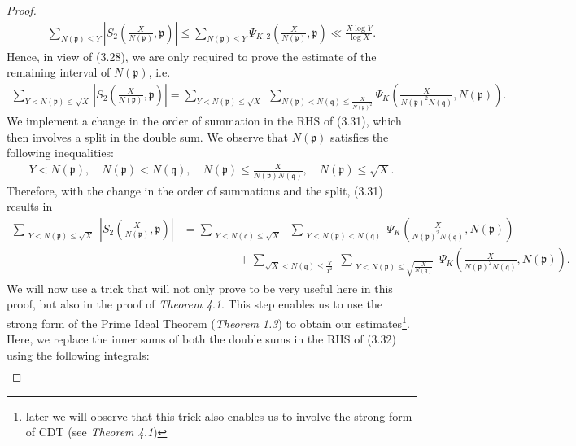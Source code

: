 \documentclass[12pt]{article}
\numberwithin{equation}{section}
\numberwithin{equation}{section}
\begin{document}
\begin{proof}
\begin{align}
    \sum_{N(\mathfrak{p})\leq Y} \left|S_2\left(\frac{X}{N(\mathfrak{p})},\mathfrak{p}\right)\right|\leq   \sum_{N(\mathfrak{p})\leq Y} \Psi_{K,2}\left(\frac{X}{N(\mathfrak{p})},\mathfrak{p}\right) \ll \frac{X\log Y}{\log X}.
\end{align}
Hence, in view of (3.28), we are only required to prove the estimate of the remaining interval of $N(\mathfrak{p})$, i.e.
\begin{align}
    \sum_{Y<N(\mathfrak{p}) \leq\sqrt{X}} \left|S_2\left(\frac{X}{N(\mathfrak{p})},\mathfrak{p}\right)\right| = \sum_{Y < N(\mathfrak{p})\leq \sqrt{X}} \;\sum_{N(\mathfrak{p})<N(\mathfrak{q})\leq \frac{X}{N(\mathfrak{p})^2}} \Psi_K\left(\frac{X}{N(\mathfrak{p})^2N(\mathfrak{q})},N(\mathfrak{p})\right).
\end{align}
We implement a change in the order of summation in the RHS of (3.31), which then involves a split in the double sum. We observe that $N(\mathfrak{p})$ satisfies the following inequalities:
\begin{align}
    Y<N(\mathfrak{p}), \quad N(\mathfrak{p})<N(\mathfrak{q}), \quad N(\mathfrak{p})\leq \frac{X}{N(\mathfrak{p})N(\mathfrak{q})},\quad N(\mathfrak{p}) \leq \sqrt{X} .\nonumber
\end{align}
Therefore, with the change in the order of summations and the split, (3.31) results in
\begin{align}
    \sum_{\substack{Y<N(\mathfrak{p}) \leq \sqrt{X} }} \left|S_2\left(\frac{X}{N(\mathfrak{p})},\mathfrak{p}\right)\right| &= \sum_{\substack{Y <N(\mathfrak{q}) \leq \sqrt{X}}} \;  \sum_{\substack{Y<N(\mathfrak{p})<N(\mathfrak{q}) }} \Psi_K\left(\frac{X}{N(\mathfrak{p})^2N(\mathfrak{q})},N(\mathfrak{p})\right) \nonumber \\ &\hspace{2cm}+ \sum_{\sqrt{X} < N(\mathfrak{q}) \leq \frac{X}{Y^2}} \;\sum_{\substack{Y<N(\mathfrak{p})\leq \sqrt{\frac{X}{N(\mathfrak{q})} } }} \Psi_K\left(\frac{X}{N(\mathfrak{p})^2N(\mathfrak{q})},N(\mathfrak{p})\right) .
\end{align}
We will now use a trick that will not only prove to be very useful here in this proof, but also in the proof of \textit{Theorem 4.1}. This step enables us to use the strong form of the Prime Ideal Theorem (\textit{Theorem 1.3}) to obtain our estimates\footnote[8]{later we will observe that this trick also enables us to involve the strong form of CDT (see \textit{Theorem 4.1})}. Here, we replace the inner sums of both the double sums in the RHS of (3.32) using the following integrals:
\begin{align}

\end{align}
\end{proof}
\end{document}
